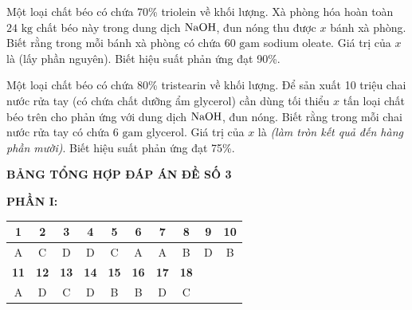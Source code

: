 \documentclass[12pt,a4paper]{article}
\begin{document}
\begin{ex}
Một loại chất béo có chứa 70\% triolein về khối lượng. Xà phòng hóa hoàn toàn $24\text{ kg}$ chất béo này trong dung dịch $\ce{NaOH}$, đun nóng thu được $x$ bánh xà phòng. Biết rằng trong mỗi bánh xà phòng có chứa $60\text{ gam}$ sodium oleate. Giá trị của $x$ là (lấy phần nguyên). Biết hiệu suất phản ứng đạt 90\%.
\end{ex}

\begin{ex}
Một loại chất béo có chứa 80\% tristearin về khối lượng. Để sản xuất 10 triệu chai nước rửa tay (có chứa chất dưỡng ẩm glycerol) cần dùng tối thiểu $x\text{ tấn}$ loại chất béo trên cho phản ứng với dung dịch $\ce{NaOH}$, đun nóng. Biết rằng trong mỗi chai nước rửa tay có chứa $6\text{ gam}$ glycerol. Giá trị của $x$ là \textit{(làm tròn kết quả đến hàng phần mười)}. Biết hiệu suất phản ứng đạt 75\%.
\end{ex}


\bigskip
\begin{center}
	\textbf{\large BẢNG TỔNG HỢP ĐÁP ÁN ĐỀ SỐ 3}
\end{center}

\noindent\textbf{PHẦN I:}
\begin{center}
\begin{tabular}{|c|c|c|c|c|c|c|c|c|c|}
\hline
\textbf{1} & \textbf{2} & \textbf{3} & \textbf{4} & \textbf{5} & \textbf{6} & \textbf{7} & \textbf{8} & \textbf{9} & \textbf{10} \\ \hline
A & C & D & D & C & A & A & B & D & B \\ \hline
\textbf{11} & \textbf{12} & \textbf{13} & \textbf{14} & \textbf{15} & \textbf{16} & \textbf{17} & \textbf{18} & & \\ \hline
A & D & C & D & B & B & D & C & & \\ \hline
\end{tabular}
\end{center}
\end{document}
